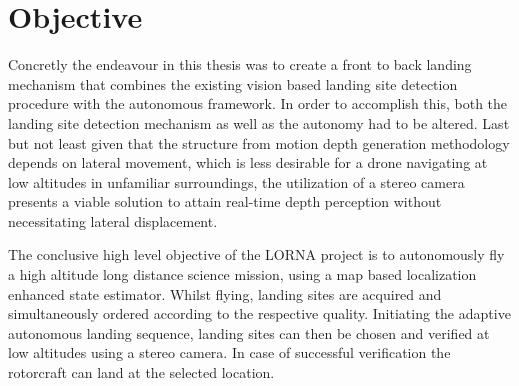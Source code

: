 \section{Objective}

Concretly the endeavour in this thesis was to create a front to back landing mechanism that combines the existing vision based landing site detection procedure with the autonomous framework. In order to accomplish this, both the landing site detection mechanism as well as the autonomy had to be altered. Last but not least given that the structure from motion depth generation methodology depends on lateral movement, which is less desirable for a drone navigating at low altitudes in unfamiliar surroundings, the utilization of a stereo camera presents a viable solution to attain real-time depth perception without necessitating lateral displacement.

The conclusive high level objective of the LORNA project is to autonomously fly a high altitude long distance science mission, using a map based localization enhanced state estimator. Whilst flying, landing sites are acquired and simultaneously ordered according to the respective quality. Initiating the adaptive autonomous landing sequence, landing sites can then be chosen and verified at low altitudes using a stereo camera. In case of successful verification the rotorcraft can land at the selected location. 